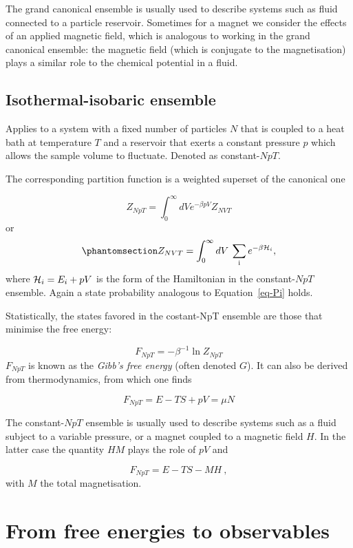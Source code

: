 \documentclass[
  letterpaper,
  enabledeprecatedfontcommands]{report}
\begin{document}
The grand canonical ensemble is usually used to describe systems such as
fluid connected to a particle reservoir. Sometimes for a magnet we
consider the effects of an applied magnetic field, which is analogous to
working in the grand canonical ensemble: the magnetic field (which is
conjugate to the magnetisation) plays a similar role to the chemical
potential in a fluid.

\subsection*{Isothermal-isobaric
ensemble}\label{isothermal-isobaric-ensemble}

Applies to a system with a fixed number of particles \(N\) that is
coupled to a heat bath at temperature \(T\) and a reservoir that exerts
a constant pressure \(p\) which allows the sample volume to fluctuate.
Denoted as constant-\(NpT\).

The corresponding partition function is a weighted superset of the
canonical one

\[
Z_{NpT}=\int_0^\infty dV  e^{-\beta p V}Z_{NVT}
\] or \begin{equation}\phantomsection\label{eq-ZNpT}{
Z_{NVT}=\int_0^\infty dV\:\sum_{\rm i}e^{-\beta {\cal H}_i},
}\end{equation} where \({\cal H}_i=E_i+pV\) is the form of the
Hamiltonian in the constant-\(NpT\) ensemble. Again a state probability
analogous to Equation~\ref{eq-Pi} holds.

Statistically, the states favored in the costant-NpT ensemble are those
that minimise the free energy:

\[
F_{NpT}=-\beta^{-1}\ln Z_{NpT}
\] \(F_{NpT}\) is known as the \emph{Gibb's free energy} (often denoted
\(G\)). It can also be derived from thermodynamics, from which one finds

\[
F_{NpT}=E-TS+pV=\mu N
\]

The constant-\(NpT\) ensemble is usually used to describe systems such
as a fluid subject to a variable pressure, or a magnet coupled to a
magnetic field \(H\). In the latter case the quantity \(HM\) plays the
role of \(pV\) and

\[
F_{NpT}=E-TS-MH\:,
\] with \(M\) the total magnetisation.

\section*{From free energies to
observables}\label{from-free-energies-to-observables}
\end{document}
